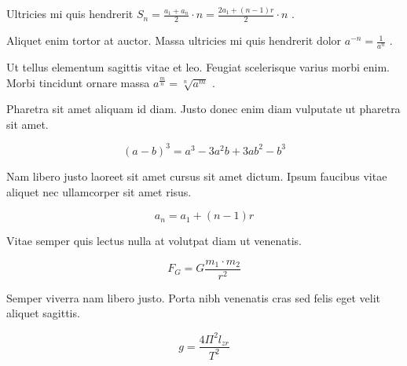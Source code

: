 \documentclass{article}
\begin{document}
Ultricies mi quis hendrerit 
\begin{math}
	S_{n}=\frac{a_{1}+a_{n}}{2}\cdot n=\frac{2a_{1}+(n-1)r}{2}\cdot n
\end{math}
.\newline

Aliquet enim tortor at auctor. Massa ultricies mi quis hendrerit dolor 
$ a^{-n}=\frac{1}{a^{n}} $
.\newline

Ut tellus elementum sagittis vitae et leo. Feugiat scelerisque varius morbi enim. Morbi tincidunt ornare massa 
\( a^{\frac{m}{n}}=\sqrt[n]{a^{m}} \)
.\newline

Pharetra sit amet aliquam id diam. Justo donec enim diam vulputate ut pharetra sit amet.

\[ (a-b)^{3}=a^{3}-3a^{2}b+3ab^{2}-b^{3} \]

Nam libero justo laoreet sit amet cursus sit amet dictum. Ipsum faucibus vitae aliquet nec ullamcorper sit amet risus.

$$ a_{n}=a_{1}+(n-1)r $$

Vitae semper quis lectus nulla at volutpat diam ut venenatis.

\begin{displaymath}
	F_{G}=G\frac{m_1\cdot m_2}{r^2}
\end{displaymath}

Semper viverra nam libero justo. Porta nibh venenatis cras sed felis eget velit aliquet sagittis.

\begin{equation}
	g=\frac{4\Pi^2l_{zr}}{T^2}
\end{equation}
\end{document}
